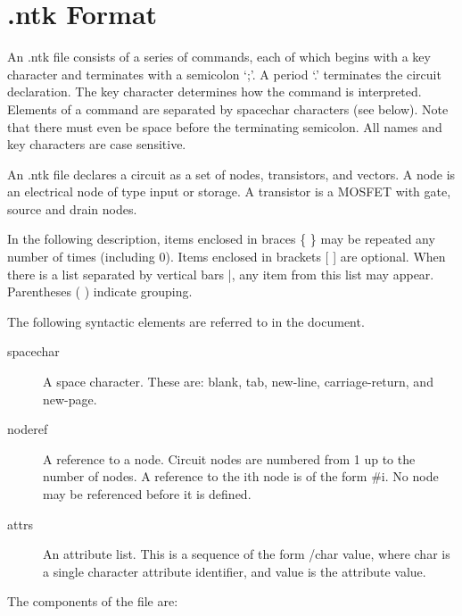\section{.ntk Format}


An .ntk file consists of a series of commands, each of which
begins with a key character and terminates with a semicolon
`;'.  A period `.' terminates the circuit declaration.  The
key character determines how the command is interpreted.
Elements of a command are separated by spacechar characters
(see below).  Note that there must even be space before the
terminating semicolon.  All names and key characters are
case sensitive.

An .ntk file declares a circuit as a set of nodes, transistors,
and vectors.  A node is an electrical node of
type input or storage.  A transistor is a MOSFET with gate,
source and drain nodes. 


In the following description, items enclosed in braces \{ \}
may be repeated any number of times (including  0).  Items
enclosed in brackets [ ] are optional.  When there is a list
separated by vertical bars |, any item from this list may
appear.  Parentheses ( ) indicate grouping.

The following syntactic elements are referred to in the
document.

\begin{description}
\item[spacechar]
A space character.  These are: blank, tab, new-line,
carriage-return, and new-page.

\item[noderef]
A reference to a node.  Circuit nodes are numbered from
1 up to the number of nodes.  A reference to the ith
node is of the form \#i.  No node may be referenced
before it is defined.

\item[attrs]
An attribute list.  This is a sequence of the form
/char value, where char is a single character attribute
identifier, and value is the attribute value.
\end{description}

The components of the file are:

